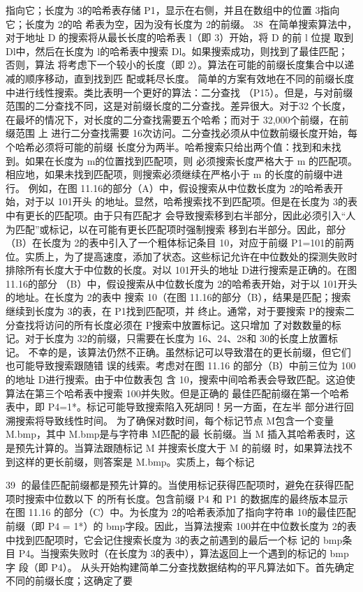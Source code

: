 指向它；长度为 3的哈希表存储 P1，显示在右侧，并且在数组中的位置 3指向它；长度为 2的哈
希表为空，因为没有长度为 2的前缀。
                                                                               38
在简单搜索算法中，对于地址 D 的搜索将从最长长度的哈希表 l（即 3）开始，将 D 的前 l 位提
取到 Dl中，然后在长度为 l的哈希表中搜索 Dl。如果搜索成功，则找到了最佳匹配；否则，算法
将考虑下一个较小的长度（即 2）。算法在可能的前缀长度集合中以递减的顺序移动，直到找到匹
配或耗尽长度。
简单的方案有效地在不同的前缀长度中进行线性搜索。类比表明一个更好的算法：二分查找
（P15）。但是，与对前缀范围的二分查找不同，这是对前缀长度的二分查找。差异很大。对于32
个长度，在最坏的情况下，对长度的二分查找需要五个哈希；而对于 32,000个前缀，在前缀范围
上
进行二分查找需要 16次访问。二分查找必须从中位数前缀长度开始，每个哈希必须将可能的前缀
长度分为两半。哈希搜索只给出两个值：找到和未找到。如果在长度为 m的位置找到匹配项，则
必须搜索长度严格大于 m 的匹配项。相应地，如果未找到匹配项，则搜索必须继续在严格小于
m 的长度的前缀中进行。
例如，在图 11.16的部分（A）中，假设搜索从中位数长度为 2的哈希表开始，对于以 101开头
的地址。显然，哈希搜索找不到匹配项。但是在长度为 3的表中有更长的匹配项。由于只有匹配才
会导致搜索移到右半部分，因此必须引入“人为匹配”或标记，以在可能有更长匹配项时强制搜索
移到右半部分。因此，部分（B）在长度为 2的表中引入了一个粗体标记条目 10，对应于前缀
P1=101的前两位。实质上，为了提高速度，添加了状态。这些标记允许在中位数处的探测失败时
排除所有长度大于中位数的长度。对以 101开头的地址 D进行搜索是正确的。在图 11.16的部分
（B）中，假设搜索从中位数长度为 2的哈希表开始，对于以 101开头的地址。在长度为 2的表中
搜索 10（在图 11.16的部分（B），结果是匹配；搜索继续到长度为 3的表，在 P1找到匹配项，并
终止。通常，对于要搜索 P的搜索二分查找将访问的所有长度必须在 P搜索中放置标记。这只增加
了对数数量的标记。对于长度为 32的前缀，只需要在长度为 16、24、28和 30的长度上放置标
记。
不幸的是，该算法仍然不正确。虽然标记可以导致潜在的更长前缀，但它们也可能导致搜索跟随错
误的线索。考虑对在图 11.16 的部分（B）中前三位为 100 的地址 D进行搜索。由于中位数表包
含 10，搜索中间哈希表会导致匹配。这迫使算法在第三个哈希表中搜索 100并失败。但是正确的
最佳匹配前缀在第一个哈希表中，即 P4=1*。标记可能导致搜索陷入死胡同！另一方面，在左半
部分进行回溯搜索将导致线性时间。
为了确保对数时间，每个标记节点 M包含一个变量 M.bmp，其中 M.bmp是与字符串 M匹配的最
长前缀。当 M 插入其哈希表时，这是预先计算的。当算法跟随标记 M 并搜索长度大于 M 的前缀
时，如果算法找不到这样的更长前缀，则答案是 M.bmp。实质上，每个标记


                                                 39
的最佳匹配前缀都是预先计算的。当使用标记获得匹配项时，避免在获得匹配项时搜索中位数以下
的所有长度。包含前缀 P4 和 P1 的数据库的最终版本显示在图 11.16 的部分（C）中。为长度为
2的哈希表添加了指向字符串 10的最佳匹配前缀（即 P4 = 1*）的 bmp字段。因此，当算法搜索
100并在中位数长度为 2的表中找到匹配项时，它会记住搜索长度为 3的表之前遇到的最后一个标
记的 bmp条目 P4。当搜索失败时（在长度为 3的表中），算法返回上一个遇到的标记的 bmp字
段（即 P4）。
从头开始构建简单二分查找数据结构的平凡算法如下。首先确定不同的前缀长度；这确定了要



